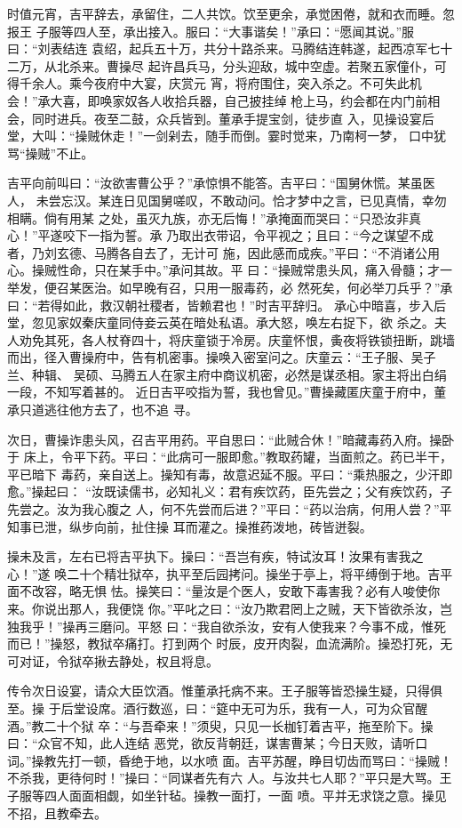 时值元宵，吉平辞去，承留住，二人共饮。饮至更余，承觉困倦，就和衣而睡。忽报王
子服等四人至，承出接入。服曰：“大事谐矣！”承曰：“愿闻其说。”服曰：“刘表结连
袁绍，起兵五十万，共分十路杀来。马腾结连韩遂，起西凉军七十二万，从北杀来。曹操尽
起许昌兵马，分头迎敌，城中空虚。若聚五家僮仆，可得千余人。乘今夜府中大宴，庆赏元
宵，将府围住，突入杀之。不可失此机会！”承大喜，即唤家奴各人收拾兵器，自己披挂绰
枪上马，约会都在内门前相会，同时进兵。夜至二鼓，众兵皆到。董承手提宝剑，徒步直
入，见操设宴后堂，大叫：“操贼休走！”一剑剁去，随手而倒。霎时觉来，乃南柯一梦，
口中犹骂“操贼”不止。

吉平向前叫曰：“汝欲害曹公乎？”承惊惧不能答。吉平曰：“国舅休慌。某虽医人，
未尝忘汉。某连日见国舅嗟叹，不敢动问。恰才梦中之言，已见真情，幸勿相瞒。倘有用某
之处，虽灭九族，亦无后悔！”承掩面而哭曰：“只恐汝非真心！”平遂咬下一指为誓。承
乃取出衣带诏，令平视之；且曰：“今之谋望不成者，乃刘玄德、马腾各自去了，无计可
施，因此感而成疾。”平曰：“不消诸公用心。操贼性命，只在某手中。”承问其故。平
曰：“操贼常患头风，痛入骨髓；才一举发，便召某医治。如早晚有召，只用一服毒药，必
然死矣，何必举刀兵乎？”承曰：“若得如此，救汉朝社稷者，皆赖君也！”时吉平辞归。
承心中暗喜，步入后堂，忽见家奴秦庆童同侍妾云英在暗处私语。承大怒，唤左右捉下，欲
杀之。夫人劝免其死，各人杖脊四十，将庆童锁于冷房。庆童怀恨，夤夜将铁锁扭断，跳墙
而出，径入曹操府中，告有机密事。操唤入密室问之。庆童云：“王子服、吴子兰、种辑、
吴硕、马腾五人在家主府中商议机密，必然是谋丞相。家主将出白绢一段，不知写着甚的。
近日吉平咬指为誓，我也曾见。”曹操藏匿庆童于府中，董承只道逃往他方去了，也不追
寻。

次日，曹操诈患头风，召吉平用药。平自思曰：“此贼合休！”暗藏毒药入府。操卧于
床上，令平下药。平曰：“此病可一服即愈。”教取药罐，当面煎之。药已半干，平已暗下
毒药，亲自送上。操知有毒，故意迟延不服。平曰：“乘热服之，少汗即愈。”操起曰：
“汝既读儒书，必知礼义：君有疾饮药，臣先尝之；父有疾饮药，子先尝之。汝为我心腹之
人，何不先尝而后进？”平曰：“药以治病，何用人尝？”平知事已泄，纵步向前，扯住操
耳而灌之。操推药泼地，砖皆迸裂。

操未及言，左右已将吉平执下。操曰：“吾岂有疾，特试汝耳！汝果有害我之心！”遂
唤二十个精壮狱卒，执平至后园拷问。操坐于亭上，将平缚倒于地。吉平面不改容，略无惧
怯。操笑曰：“量汝是个医人，安敢下毒害我？必有人唆使你来。你说出那人，我便饶
你。”平叱之曰：“汝乃欺君罔上之贼，天下皆欲杀汝，岂独我乎！”操再三磨问。平怒
曰：“我自欲杀汝，安有人使我来？今事不成，惟死而已！”操怒，教狱卒痛打。打到两个
时辰，皮开肉裂，血流满阶。操恐打死，无可对证，令狱卒揪去静处，权且将息。

传令次日设宴，请众大臣饮酒。惟董承托病不来。王子服等皆恐操生疑，只得俱至。操
于后堂设席。酒行数巡，曰：“筵中无可为乐，我有一人，可为众官醒酒。”教二十个狱
卒：“与吾牵来！”须臾，只见一长枷钉着吉平，拖至阶下。操曰：“众官不知，此人连结
恶党，欲反背朝廷，谋害曹某；今日天败，请听口词。”操教先打一顿，昏绝于地，以水喷
面。吉平苏醒，睁目切齿而骂曰：“操贼！不杀我，更待何时！”操曰：“同谋者先有六
人。与汝共七人耶？”平只是大骂。王子服等四人面面相觑，如坐针毡。操教一面打，一面
喷。平并无求饶之意。操见不招，且教牵去。

